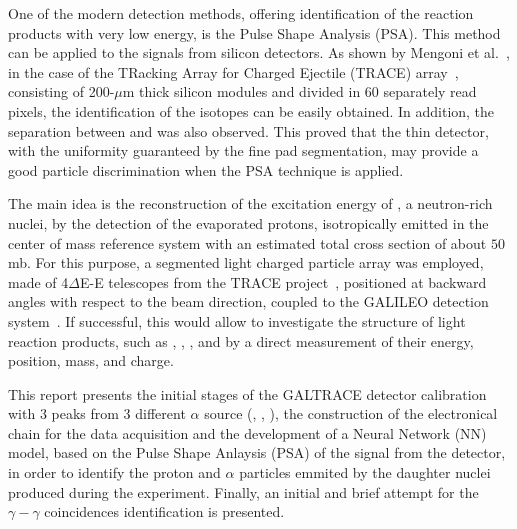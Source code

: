 One of the modern detection methods, offering identification of the reaction
products with very low energy, is the Pulse Shape Analysis (PSA). This method
can be applied to the signals from silicon detectors. As shown by Mengoni et
al.~\cite{mengoni}, in the case of the TRacking Array for Charged Ejectile (TRACE) array~\cite{mengoni}, consisting
of 200-$\mu$m thick silicon modules and divided in 60 separately read pixels,
the identification of the  isotopes can be easily obtained.
In addition, the separation between  and  was also
observed. This proved that the thin detector, with the uniformity guaranteed
by the fine pad segmentation, may provide a good particle discrimination when
the PSA technique is applied.

\bigbreak

The main idea is the reconstruction of the excitation energy of ,
a neutron-rich nuclei, by the detection of the evaporated protons,
isotropically emitted in the center of mass reference system with an estimated total cross section of about $50$ mb. For this purpose, a segmented light
charged particle array was employed, made of 4$\Delta$E-E telescopes from the
TRACE project~\cite{mengoni}, positioned at backward angles with respect to
the beam direction, coupled to the GALILEO detection system~\cite{galileo}.
If successful, this would allow to investigate the structure of light reaction
products, such as , , ,  and  by a direct
measurement of their energy, position, mass, and charge.

\bigbreak

This report presents the initial stages of the GALTRACE detector calibration
with 3 peaks from 3 different $\alpha$ source (, ,
), the construction of the electronical chain for the data
acquisition and the development of a Neural Network (NN) model, based on the
Pulse Shape Anlaysis (PSA) of the signal from the detector, in order to
identify the proton and $\alpha$ particles emmited by the daughter nuclei
produced during the experiment. Finally, an initial and brief attempt for the
$\gamma-\gamma$ coincidences identification is presented.